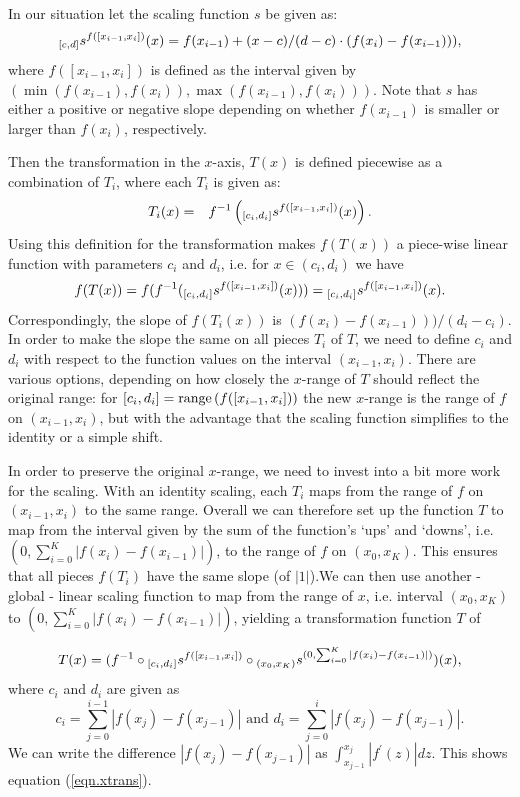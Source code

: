 \documentclass[11pt]{isuthesis}\usepackage[]{graphicx}\usepackage[]{color}
\begin{document}
In our situation let the scaling function $s$ be given as:
\[
{_{[c,d]}s^{ f([x_{i-1}, x_i])}}(x) = f(x_{i-1}) + (x-c)/(d-c) \cdot (f(x_{i}) - f(x_{i-1}))),
\]
where $f([x_{i-1}, x_i])$ is defined as the interval given by $(\min(f(x_{i-1}), f(x_i)), \max(f(x_{i-1}), f(x_i)))$.
Note that $s$ has either a positive or negative slope depending on whether $f(x_{i-1})$ is smaller or larger than $f(x_i)$, respectively.

Then the transformation in the $x$-axis, $T(x)$ is defined piecewise as a combination of $T_i$, where each $T_i$ is given as:
\begin{eqnarray}\label{eq.x.transformation}
T_i(x) &=& f^{-1}\left( {_{[c_i,d_i]}s^{ f([x_{i-1}, x_i])}}(x) \right). 
\end{eqnarray}
%
Using this definition for the transformation makes $f(T(x))$ a piece-wise linear function with parameters $c_i$ and $d_i$, i.e. for $x \in (c_i,d_i)$ we have
\[
f(T(x)) = f (f^{-1}({_{[c_i,d_i]}s^{ f([x_{i-1}, x_i])}}(x))) = {_{[c_i,d_i]}s^{ f([x_{i-1}, x_i])}}(x).
\]
Correspondingly, the slope of $f(T_i(x))$ is $(f(x_{i}) - f(x_{i-1})))/(d_i-c_i)$.
In order to make the slope the same on all pieces $T_i$ of $T$, we need to define $c_i$ and $d_i$ with respect to the function values on the interval $(x_{i-1}, x_i)$. There are various options, depending on how closely the $x$-range of $T$ should reflect the original range:
for $[c_i, d_i] = {\text{range}\left(f([x_{i-1}, x_i])\right)}$ the new $x$-range is the range of $f$ on $(x_{i-1}, x_i)$, but with the advantage that the scaling function simplifies to the identity or a simple shift.

In order to preserve the original $x$-range, we need to invest into a bit more work for the scaling. With an identity scaling, each $T_i$ maps from the range of $f$ on $(x_{i-1}, x_i)$ to the same range. Overall we can therefore set up the function $T$ to map from the interval given by the sum of the function's `ups' and `downs', i.e.
$(0, \sum_{i=0}^K |f(x_i) - f(x_{i-1})|)$, to the range of $f$ on $(x_0, x_K)$.  This ensures that all pieces $f(T_i)$ have the same slope (of $|1|$).We can then use another - global - linear scaling function to map from the range of $x$, i.e. interval $(x_0, x_K)$ to $(0, \sum_{i=0}^K |f(x_i) - f(x_{i-1})|)$, yielding a transformation function $T$ of

\[
T (x) =  (f^{-1} \circ {_{[c_i,d_i]}s^{ f([x_{i-1}, x_i])}} \circ {_{(x_0, x_K)}s^{ (0, \sum_{i=0}^K |f(x_i) - f(x_{i-1})|)}}) (x),  
\]
where $c_i$ and $d_i$ are given as 
\[
c_i = \sum_{j=0}^{i-1} |f(x_j) - f(x_{j-1})| \text{ and } d_i = \sum_{j=0}^{i} |f(x_j) - f(x_{j-1})|.
\]
We can write the difference $|f(x_j) - f(x_{j-1})|$ as $\int_{x_{j-1}}^{x_j} |f^\prime(z)|dz$. This shows equation (\ref{eqn.xtrans}).
\end{document}
